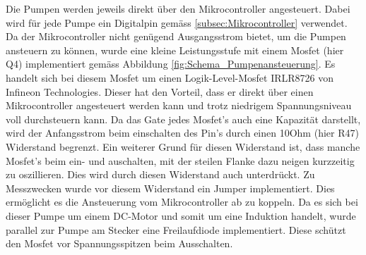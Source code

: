 Die Pumpen werden jeweils direkt über den Mikrocontroller angesteuert. Dabei wird für jede Pumpe ein Digitalpin gemäss \ref{subsec:Mikrocontroller} verwendet. Da der Mikrocontroller nicht genügend Ausgangsstrom bietet, um die Pumpen ansteuern zu können, wurde eine kleine Leistungsstufe mit einem Mosfet (hier Q4) implementiert gemäss Abbildung \ref{fig:Schema_Pumpenansteuerung}. Es handelt sich bei diesem Mosfet um einen Logik-Level-Mosfet IRLR8726 von Infineon Technologies. Dieser hat den Vorteil, dass er direkt über einen Mikrocontroller angesteuert werden kann und trotz niedrigem Spannungsniveau voll durchsteuern kann. Da das Gate jedes Mosfet's auch eine Kapazität darstellt, wird der Anfangsstrom beim einschalten des Pin's durch einen 10Ohm (hier R47) Widerstand begrenzt. Ein weiterer Grund für diesen Widerstand ist, dass manche Mosfet's beim ein- und auschalten, mit der steilen Flanke dazu neigen kurzzeitig zu oszillieren. Dies wird durch diesen Widerstand auch unterdrückt. Zu Messzwecken wurde vor diesem Widerstand ein Jumper implementiert. Dies ermöglicht es die Ansteuerung vom Mikrocontroller ab zu koppeln. Da es sich bei dieser Pumpe um einem DC-Motor und somit um eine Induktion handelt, wurde parallel zur Pumpe am Stecker eine Freilaufdiode implementiert. Diese schützt den Mosfet vor Spannungsspitzen beim Ausschalten. \cite[S.362]{atmel_atmel_2014} \cite{aiyimaindustrial_store_us_nodate} \cite{mouser_mp24943dn-lf_nodate}

